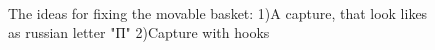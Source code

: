 \begin{enumerate}
\begin{enumerate}
\begin{enumerate}
			\begin{figure}[H]
				\begin{minipage}[h]{0.2\linewidth}
					\center  
				\end{minipage}
				\begin{minipage}[h]{0.6\linewidth}
					\caption{The ideas for fixing the movable basket: 1)A capture, that look likes as russian letter "П" 2)Capture with hooks}
				\end{minipage}
			\end{figure}
			
		\end{enumerate}
		

\end{enumerate}
\end{enumerate}
